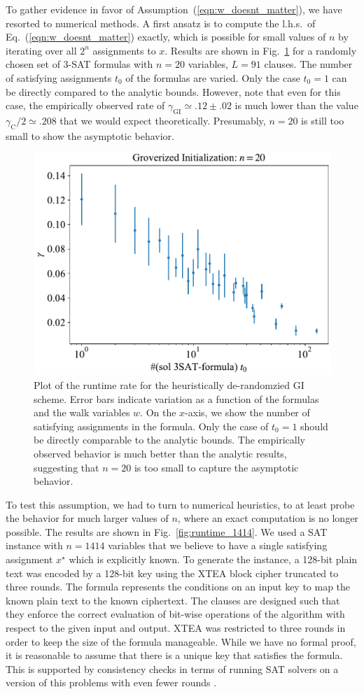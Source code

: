 \documentclass[a4paper,aps,floatfix]{revtex4}
\begin{document}
To gather evidence in favor of Assumption~(\ref{eqn:w_doesnt_matter}), we have resorted to numerical methods.
A first ansatz is to compute the l.h.s.\ of Eq.~(\ref{eqn:w_doesnt_matter}) exactly, which is possible for small values of $n$ by iterating over all $2^n$ assignments to $x$.
Results are shown in Fig.~\ref{fig:numerics_20_b} for a randomly chosen set of $3$-SAT formulas with $n=20$ variables, $L=91$ clauses. 
The number of satisfying assignments $t_0$ of the formulas are varied.
Only the case $t_0=1$ can be directly compared to the analytic bounds.
However, note that even for this case, the empirically observed rate of $\gamma_{\mathrm{GI}}\simeq .12 \pm .02$ is much lower than the value $\gamma_{\mathrm{C}}/2 \simeq .208$ that we would expect theoretically.
Presumably, $n=20$ is still too small to show the asymptotic behavior.

\begin{figure}[ht]
	\centering
        \includegraphics[width=.45\textwidth]{images/gamma_same_choices_per_step.pdf}
        \caption{\label{fig:numerics_20_b}
					Plot of the runtime rate for the heuristically de-randomzied GI scheme.
					Error bars indicate variation as a function of the formulas and the walk variables $w$.
					On the $x$-axis, we show the number of satisfying assignments in the formula. 
					Only the case of $t_0=1$ should be directly comparable to the analytic bounds.
					The empirically observed behavior is much better than the analytic results, suggesting that $n=20$ is too small to capture the asymptotic behavior.
			}
\end{figure}

To test this assumption, we had to turn to numerical heuristics, to at least probe the behavior for much larger values of $n$, where an exact computation is no longer possible.
The results are shown in Fig.~\ref{fig:runtime_1414}.
We used a SAT instance with $n=1414$ variables that we believe to have a single satisfying assignment $x^\star$ which is explicitly known.
To generate the instance, a 128-bit plain text was encoded by a 128-bit key using the XTEA block cipher truncated to three rounds.
The formula represents the conditions on an input key to map the known plain text to the known ciphertext. 
The clauses are designed such that they enforce the correct evaluation of bit-wise operations of the algorithm with respect to the given input and output. 
XTEA was restricted to three rounds in order to keep the size of the formula manageable. 
While we have no formal proof, it is reasonable to assume that there is a unique key that satisfies the formula.
This is supported by consistency checks in terms of running SAT solvers on a version of this problems with even fewer rounds \cite{philipp-private-commutation}.
\end{document}
